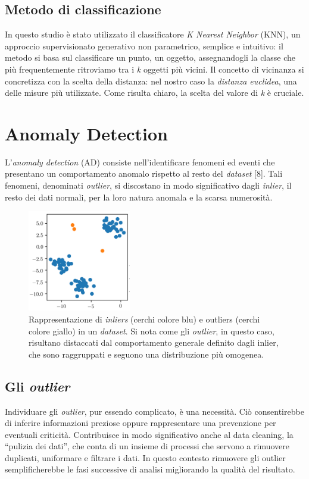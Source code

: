 \subsection{Metodo di classificazione}
In questo studio è stato utilizzato il classificatore \textit{K Nearest Neighbor} (KNN), un approccio
supervisionato generativo non parametrico, semplice e intuitivo: il metodo si basa sul
classificare un punto, un oggetto, assegnandogli la classe che più frequentemente ritroviamo
tra i \textit{k} oggetti più vicini. Il concetto di vicinanza si concretizza con la scelta della distanza: nel
nostro caso la \textit{distanza euclidea}, una delle misure più utilizzate. Come risulta chiaro, la scelta
del valore di \textit{k} è cruciale.


\section{Anomaly Detection}
L’\textit{anomaly detection} (AD) consiste nell’identificare fenomeni ed eventi che presentano un
comportamento anomalo rispetto al resto del \textit{dataset} [8]. Tali fenomeni, denominati \textit{outlier}, si discostano in modo significativo dagli \textit{inlier}, il resto dei dati normali, per la loro natura anomala e la scarsa numerosità.

\begin{figure}[htp]
	\centering
	\includegraphics[width=0.4\textwidth]{img/cap2-AnomalyDetection.png}
	\caption{Rappresentazione di \textit{inliers} (cerchi colore blu) e outliers (cerchi colore giallo) in un \textit{dataset}. Si nota come gli \textit{outlier}, in questo caso, risultano distaccati dal comportamento generale definito dagli inlier, che sono raggruppati e seguono una distribuzione più omogenea.}
	\label{fig2.3}
\end{figure}

\subsection{Gli \textit{outlier}}
Individuare gli \textit{outlier}, pur essendo complicato, è una necessità. Ciò consentirebbe di inferire
informazioni preziose oppure rappresentare una prevenzione per eventuali criticità.
Contribuisce in modo significativo anche al data cleaning, la “pulizia dei dati”, che conta di
un insieme di processi che servono a rimuovere duplicati, uniformare e filtrare i dati. In
questo contesto rimuovere gli outlier semplificherebbe le fasi successive di analisi
migliorando la qualità del risultato.

